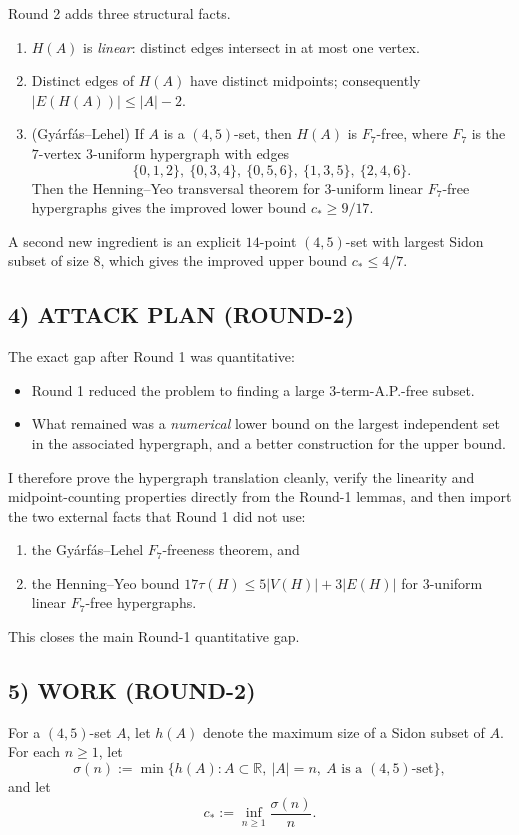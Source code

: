 Round 2 adds three structural facts.
\begin{enumerate}
\item[(i)] $H(A)$ is \emph{linear}: distinct edges intersect in at most one vertex.
\item[(ii)] Distinct edges of $H(A)$ have distinct midpoints; consequently $|E(H(A))|\le |A|-2$.
\item[(iii)] (Gy\'arf\'as--Lehel) If $A$ is a $(4,5)$-set, then $H(A)$ is $F_7$-free, where $F_7$ is the $7$-vertex $3$-uniform hypergraph with edges
\[
\{0,1,2\},\ \{0,3,4\},\ \{0,5,6\},\ \{1,3,5\},\ \{2,4,6\}.
\]
Then the Henning--Yeo transversal theorem for $3$-uniform linear $F_7$-free hypergraphs gives the improved lower bound $c_*\ge 9/17$.
\end{enumerate}
A second new ingredient is an explicit $14$-point $(4,5)$-set with largest Sidon subset of size $8$, which gives the improved upper bound $c_*\le 4/7$.

\subsection*{4) ATTACK PLAN (ROUND-2)}
The exact gap after Round 1 was quantitative:
\begin{itemize}
\item Round 1 reduced the problem to finding a large $3$-term-A.P.-free subset.
\item What remained was a \emph{numerical} lower bound on the largest independent set in the associated hypergraph, and a better construction for the upper bound.
\end{itemize}
I therefore prove the hypergraph translation cleanly, verify the linearity and midpoint-counting properties directly from the Round-1 lemmas, and then import the two external facts that Round 1 did not use:
\begin{enumerate}
\item the Gy\'arf\'as--Lehel $F_7$-freeness theorem, and
\item the Henning--Yeo bound $17\tau(H)\le 5|V(H)|+3|E(H)|$ for $3$-uniform linear $F_7$-free hypergraphs.
\end{enumerate}
This closes the main Round-1 quantitative gap.

\subsection*{5) WORK (ROUND-2)}
For a $(4,5)$-set $A$, let $h(A)$ denote the maximum size of a Sidon subset of $A$. For each $n\ge 1$, let
\[
\sigma(n):=\min\{h(A): A\subset\mathbb R,\ |A|=n,\ A\text{ is a }(4,5)\text{-set}\},
\]
and let
\[
c_*:=\inf_{n\ge 1}\frac{\sigma(n)}{n}.
\]

